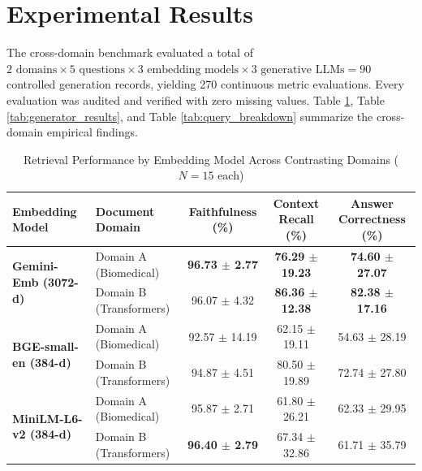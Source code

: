 \documentclass[conference]{IEEEtran}
\begin{document}
\section{Experimental Results}

The cross-domain benchmark evaluated a total of $2 \text{ domains} \times 5 \text{ questions} \times 3 \text{ embedding models} \times 3 \text{ generative LLMs} = 90$ controlled generation records, yielding 270 continuous metric evaluations. Every evaluation was audited and verified with zero missing values. Table \ref{tab:embedding_results}, Table \ref{tab:generator_results}, and Table \ref{tab:query_breakdown} summarize the cross-domain empirical findings.

\begin{table}[htbp]
\caption{Retrieval Performance by Embedding Model Across Contrasting Domains ($N=15$ each)}
\label{tab:embedding_results}
\centering
\begin{tabular}{llccc}
\toprule
\textbf{Embedding Model} & \textbf{Document Domain} & \textbf{Faithfulness (\%)} & \textbf{Context Recall (\%)} & \textbf{Answer Correctness (\%)} \\
\midrule
\multirow{2}{*}{\textbf{Gemini-Emb (3072-d)}} 
 & Domain A (Biomedical) & \textbf{96.73 $\pm$ 2.77} & \textbf{76.29 $\pm$ 19.23} & \textbf{74.60 $\pm$ 27.07} \\
 & Domain B (Transformers) & 96.07 $\pm$ 4.32 & \textbf{86.36 $\pm$ 12.38} & \textbf{82.38 $\pm$ 17.16} \\
\midrule
\multirow{2}{*}{\textbf{BGE-small-en (384-d)}} 
 & Domain A (Biomedical) & 92.57 $\pm$ 14.19 & 62.15 $\pm$ 19.11 & 54.63 $\pm$ 28.19 \\
 & Domain B (Transformers) & 94.87 $\pm$ 4.51 & 80.50 $\pm$ 19.89 & 72.74 $\pm$ 27.80 \\
\midrule
\multirow{2}{*}{\textbf{MiniLM-L6-v2 (384-d)}} 
 & Domain A (Biomedical) & 95.87 $\pm$ 2.71 & 61.80 $\pm$ 26.21 & 62.33 $\pm$ 29.95 \\
 & Domain B (Transformers) & \textbf{96.40 $\pm$ 2.79} & 67.34 $\pm$ 32.86 & 61.71 $\pm$ 35.79 \\
\bottomrule
\end{tabular}
\end{table}
\end{document}
